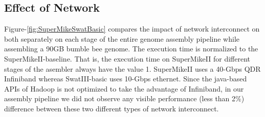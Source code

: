 \documentclass[conference]{IEEEtran}
\begin{document}
\subsection {Effect of Network} \label{EffectOfNetwork}
Figure-\ref{fig:SuperMikeSwatBasic} compares the impact of network interconnect on both separately on each stage of the entire genome assembly pipeline while assembling a 90GB bumble bee genome. 
The execution time is normalized to the SuperMikeII-baseline. That is, the execution time on SuperMikeII for different stages of the asembler always have the value 1.
SuperMikeII uses a 40-Gbps QDR Infiniband whereas SwatIII-basic uses 10-Gbps ethernet. 
Since the java-based APIs of Hadoop is not optimized to take the advantage of Infiniband, in our assembly pipeline we did not observe any visible performance (less than 2\%) difference between these two different types of network interconnect.

\end{document}
